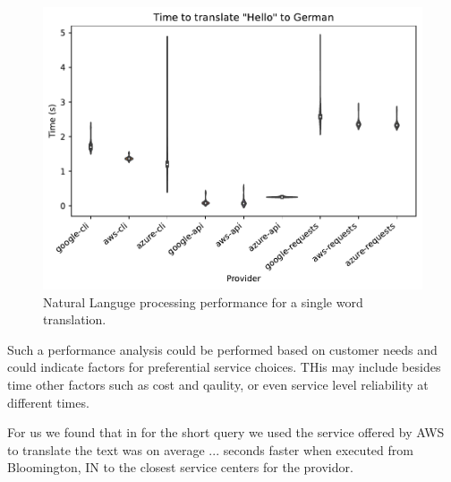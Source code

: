 \begin{figure}[htb]

\centering
\includegraphics[width=1.0\columnwidth]{images/nlp-benchmark.pdf}

\caption{Natural Languge processing performance for a single
         word translation.}
\label{fig:nlp-performance}

\end{figure}


Such a performance analysis could be performed based on customer needs
and could indicate factors for preferential service choices. THis may
include besides time other factors such as cost and qaulity, or even
service level reliability at different times.

For us we found that in for the short query we used the service
offered by AWS to translate the text was on average ...  seconds
faster when executed from Bloomington, IN to the closest service
centers for the providor.


